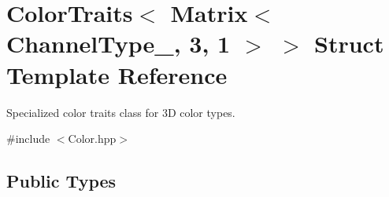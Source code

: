 \hypertarget{struct_d_o_1_1_color_traits_3_01_matrix_3_01_channel_type___00_013_00_011_01_4_01_4}{\section{Color\-Traits$<$ Matrix$<$ Channel\-Type\-\_\-, 3, 1 $>$ $>$ Struct Template Reference}
\label{struct_d_o_1_1_color_traits_3_01_matrix_3_01_channel_type___00_013_00_011_01_4_01_4}
}


Specialized color traits class for 3\-D color types.  




{\ttfamily \#include $<$Color.\-hpp$>$}

\subsection*{Public Types}
